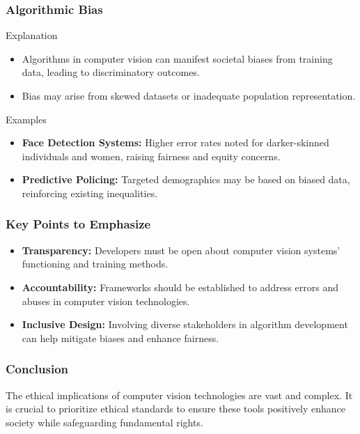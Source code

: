 \documentclass[aspectratio=169]{beamer}
\begin{document}
\begin{frame}[fragile]
    \frametitle{Algorithmic Bias}
    \begin{block}{Explanation}
        \begin{itemize}
            \item Algorithms in computer vision can manifest societal biases from training data, leading to discriminatory outcomes.
            \item Bias may arise from skewed datasets or inadequate population representation.
        \end{itemize}
    \end{block}

    \begin{block}{Examples}
        \begin{itemize}
            \item \textbf{Face Detection Systems:} Higher error rates noted for darker-skinned individuals and women, raising fairness and equity concerns.
            \item \textbf{Predictive Policing:} Targeted demographics may be based on biased data, reinforcing existing inequalities.
        \end{itemize}
    \end{block}
\end{frame}

\begin{frame}[fragile]
    \frametitle{Key Points to Emphasize}
    \begin{itemize}
        \item \textbf{Transparency:} Developers must be open about computer vision systems' functioning and training methods.
        \item \textbf{Accountability:} Frameworks should be established to address errors and abuses in computer vision technologies.
        \item \textbf{Inclusive Design:} Involving diverse stakeholders in algorithm development can help mitigate biases and enhance fairness.
    \end{itemize}
\end{frame}

\begin{frame}[fragile]
    \frametitle{Conclusion}
    The ethical implications of computer vision technologies are vast and complex. It is crucial to prioritize ethical standards to ensure these tools positively enhance society while safeguarding fundamental rights.
\end{frame}
\end{document}
